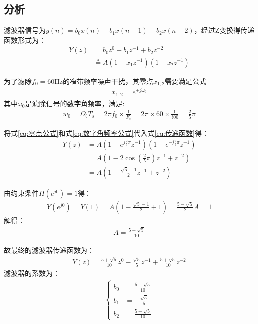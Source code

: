 \documentclass{ctexart}
\begin{document}
		\subsection{分析}
			滤波器信号为$y(n)=b_0x(n)+b_1x(n-1)+b_2x(n-2)$，经过Z变换得传递函数形式为：
			\begin{align}
				Y(z)&=b_0z^0+b_1z^{-1}+b_2z^{-2}\\
					&\triangleq A(1-x_1z^{-1})(1-x_2z^{-1})
					\label{eq:传递函数}
			\end{align}\par
			为了滤除$f_0=60$Hz的窄带频率噪声干扰，其零点$x_{1,2}$需要满足公式
			\begin{gather}
				x_{1,2}=e^{\pm j\omega_0}
				\label{eq:零点公式}
			\end{gather}
			其中$\omega_0$是滤除信号的数字角频率，满足:
			\begin{gather}
				w_0=\Omega_0 T_s=2\pi f_0\times\frac{1}{F_s}=2\pi \times60\times\frac{1}{300}=\frac{2}{5}\pi
				\label{eq:数字角频率公式}
			\end{gather}\par
			将式\ref{eq:零点公式}和式\ref{eq:数字角频率公式}代入式\ref{eq:传递函数}得：
			\begin{align}
				Y(z)&=A(1-e^{j\frac{2}{5}\pi}z^{-1})(1-e^{-j\frac{2}{5}\pi}z^{-1})\\
				&=A(1-2\cos(\frac{2}{5}\pi)z^{-1}+z^{-2})\\
				&=A(1-\frac{\sqrt{5}-1}{2}z^{-1}+z^{-2})
			\end{align}\par
			由约束条件$H(e^{j0})=1$得：
			\begin{gather}
				Y(e^{j0})=Y(1)=A(1-\frac{\sqrt{5}-1}{2}+1)=\frac{5-\sqrt{5}}{2}A=1
			\end{gather}
			解得：
			\begin{gather}
				A=\frac{5+\sqrt{5}}{10}
			\end{gather}\par
			故最终的滤波器传递函数为：
			\begin{gather}
				Y(z)=\frac{5+\sqrt{5}}{10}z^{0}-\frac{\sqrt{5}}{5}z^{-1}+\frac{5+\sqrt{5}}{10}z^{-2}
			\end{gather}
			滤波器的系数为：
			\begin{gather}
				\begin{cases}
					b_0&=\frac{5+\sqrt{5}}{10}\\
					b_1&=-\frac{\sqrt{5}}{5}\\
					b_2&=\frac{5+\sqrt{5}}{10}
				\end{cases}
			\end{gather}\par
\end{document}
